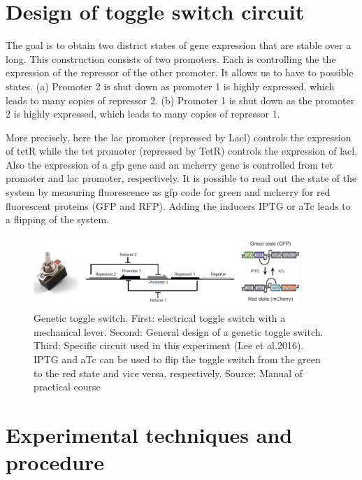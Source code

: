 \documentclass[english,11pt,a4paper]{article}
\begin{document}
\newpage

\section{Design of toggle switch circuit} 

The goal is to obtain two district states of gene expression that are stable over a long. 
This construction consists of two promoters. Each is controlling the the expression of the repressor of the other promoter. 
It allows us to have to possible states. (a) Promoter 2 is shut down as promoter 1 is highly expressed, which leads to many copies of repressor 2.
(b) Promoter 1 is shut down as the promoter 2 is highly expressed, which leads to many copies of repressor 1.

More precisely, here the lac promoter (repressed by Lacl) controls the expression of tetR while the tet promoter (repressed by TetR) controls the expression of lacl. Also the expression of a gfp gene and an mcherry gene is controlled from tet promoter and lac promoter, respectively. 
It is possible to read out the state of the system by measuring fluorescence as gfp code for green and mcherry for red fluorescent proteins (GFP and RFP).
Adding the inducers IPTG or aTc leads to a flipping of the system.


\begin{figure}[htbp] 
  \centering
     \includegraphics[width=0.9\textwidth]{Design}
  \caption{ Genetic toggle switch. First: electrical toggle switch with a mechanical lever. Second: General design of a genetic toggle switch. Third: Specific circuit used in this experiment (Lee et al.2016). IPTG and aTc can be used to flip the toggle switch from the green to the red state and vice versa, respectively. Source: Manual of practical course }
  \label{fig:Bild2}
\end{figure}

\newpage
\section{Experimental techniques and procedure}
\end{document}
